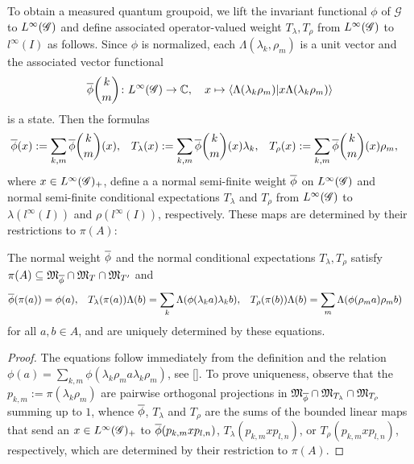 To obtain a measured quantum groupoid, we lift the invariant
functional $\phi$ of $\mathscr{G}$ to $L^{\infty}(\mathscr{G})$ and define associated
operator-valued weight $T_{\lambda},T_{\rho}$ from $L^{\infty}(\mathscr{G})$ to
$l^{\infty}(I)$ as follows. Since $\phi$ is normalized, each
$\Lambda(\lambda_{k},\rho_{m})$ is a unit vector and the associated
vector functional
\begin{align*}
  \overline{\phi}{k\choose m}\colon L^{\infty}(\mathscr{G}) \to  \mathbb{C}, \quad x \mapsto \langle\Lambda(\lambda_{k}\rho_{m})|x\Lambda(\lambda_{k}\rho_{m})\rangle
\end{align*}
is a state.  Then the formulas
\begin{align} \label{eq:vn-weights}
  \overline{\phi}(x) &:= \sum_{k,m} \overline{\phi}{k\choose m}(x), &
    T_{\lambda}(x)&:= \sum_{k,m}
\overline{\phi}{k\choose m}(x)\lambda_{k}, & 
T_{\rho}(x)&:=
    \sum_{k,m} \overline{\phi}{k\choose m}(x)\rho_{m},
\end{align}
where $x\in L^{\infty}(\mathscr{G})_{+}$, define a a normal semi-finite weight $\overline{\phi}$
on $L^{\infty}(\mathscr{G})$ and normal semi-finite conditional expectations $T_{\lambda}$ and
$T_{\rho}$ from $L^{\infty}(\mathscr{G})$ to $\lambda(l^{\infty}(I))$ and
$\rho(l^{\infty}(I))$, respectively. These maps are determined by
their restrictions to $\pi(A)$:
\begin{Lem} \label{lemma:vn-weights-unique} The normal weight $\overline{\phi}$ and
  the normal conditional expectations $T_{\lambda},T_{\rho}$ satisfy $\pi(A) \subseteq
  \mathfrak{M}_{\overline{\phi}} \cap \mathfrak{M}_{T} \cap \mathfrak{M}_{T'}$
  and
  \begin{align*}
    \overline{\phi}(\pi(a))&= \phi(a), & T_{\lambda}(\pi(a))\Lambda(b) &=
    \sum_{k}\Lambda(\phi(\lambda_{k}a)\lambda_{k}b), &
    T_{\rho}(\pi(b))\Lambda(b) &= \sum_{m}\Lambda(\phi(\rho_{m}a)\rho_{m}b)
  \end{align*}
  for all $a,b\in A$, and are uniquely determined by these equations. 
\end{Lem}
\begin{proof}
  The equations follow immediately from the definition and the
  relation $\phi(a)=\sum_{k,m}
  \phi(\lambda_{k}\rho_{m}a\lambda_{k}\rho_{m})$, see \ref{}. To prove
  uniqueness, observe that the $p_{k,m}:=\pi(\lambda_{k}\rho_{m})$ are
  pairwise orthogonal projections in $\mathfrak{M}_{\overline{\phi}}
  \cap \mathfrak{M}_{T_{\lambda}} \cap \mathfrak{M}_{T_{\rho}}$
  summing up to $1$, whence $\overline{\phi}$, $T_{\lambda}$ and $T_{\rho}$ are
  the sums of the bounded linear maps that send an $x\in L^{\infty}(\mathscr{G})_{+}$
  to $\overline{\phi}(p_{k,m}xp_{l,n})$, $T_{\lambda}(p_{k,m}xp_{l,n})$, or
  $T_{\rho}(p_{k,m}xp_{l,n})$, respectively, which are determined by
  their restriction to $\pi(A)$.
\end{proof}
